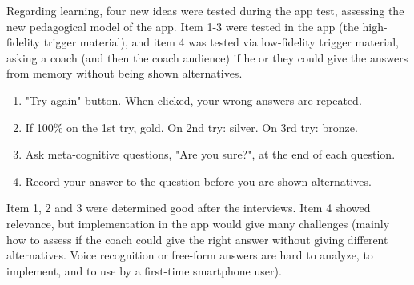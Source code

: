   Regarding learning, four new ideas were tested during the app test, assessing the new pedagogical model of the app. Item 1-3 were tested in the app (the high-fidelity trigger material), and item 4 was tested via low-fidelity trigger material, asking a coach (and then the coach audience) if he or they could give the answers from memory without being shown alternatives.

  \begin{enumerate}
  \item "Try again"-button. When clicked, your wrong answers are repeated.
  \item If 100\% on the 1st try, gold. On 2nd try: silver. On 3rd try: bronze.
  \item Ask meta-cognitive questions, "Are you sure?", at the end of each question.
  \item Record your answer to the question before you are shown alternatives.
  \end{enumerate}

  Item 1, 2 and 3 were determined good after the interviews. Item 4 showed relevance, but implementation in the app would give many challenges (mainly how to assess if the coach could give the right answer without giving different alternatives. Voice recognition or free-form answers are hard to analyze, to implement, and to use by a first-time smartphone user).

  \clearpage
